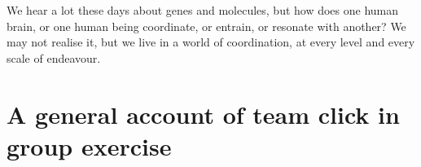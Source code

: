 \begin{savequote}[8cm]

  We hear a lot these days about genes and molecules, but how does one human brain, or one human being coordinate, or entrain, or resonate with another?  We may not realise it, but we live in a world of coordination, at every level and every scale of endeavour.


\end{savequote}






\chapter{\label{chap:theory}A general account of team click in group exercise}

\minitoc


